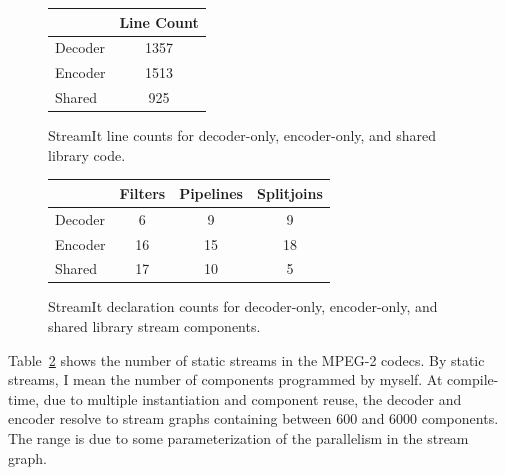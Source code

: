 \begin{figure}[t]
  \begin{center}
    \begin{tabular}{|l|c|}
\hline
 & Line Count \\
\hline
Decoder & 1357 \\
Encoder & 1513 \\
Shared & 925 \\
\hline
    \end{tabular}
  \end{center}
  \caption{StreamIt line counts for decoder-only, encoder-only, and shared library code.}
  \label{table:line_counts}
\end{figure}

\begin{figure}[t]
  \begin{center}
    \begin{tabular}{|l|c|c|c|}
\hline
        & Filters & Pipelines & Splitjoins \\
\hline
Decoder & 6       & 9         & 9 \\
Encoder & 16      & 15        & 18 \\
Shared  & 17      & 10        & 5 \\
\hline
    \end{tabular}
  \end{center}
  \caption{StreamIt declaration counts for decoder-only, encoder-only, and shared library stream components.}
  \label{table:component_counts}
\end{figure}

Table~\ref{table:component_counts} shows the number of static streams in 
the MPEG-2 codecs. By static streams, I mean the number of components 
programmed by myself. At compile-time, due to multiple instantiation and 
component reuse, the decoder and encoder resolve to stream graphs 
containing between 600 and 6000 components. The range is due to some 
parameterization of the parallelism in the stream graph.

